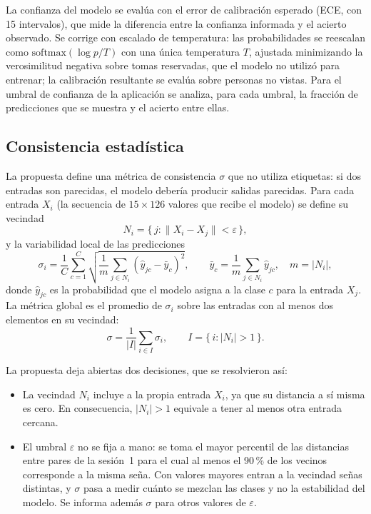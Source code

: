 La confianza del modelo se evalúa con el error de calibración esperado (ECE, con 15 intervalos), que mide la diferencia entre la confianza informada y el acierto observado. Se corrige con escalado de temperatura: las probabilidades se reescalan como $\mathrm{softmax}(\log p / T)$ con una única temperatura $T$, ajustada minimizando la verosimilitud negativa sobre tomas reservadas, que el modelo no utilizó para entrenar; la calibración resultante se evalúa sobre personas no vistas. Para el umbral de confianza de la aplicación se analiza, para cada umbral, la fracción de predicciones que se muestra y el acierto entre ellas.

\subsection{Consistencia estadística}

La propuesta define una métrica de consistencia $\sigma$ que no utiliza etiquetas: si dos entradas son parecidas, el modelo debería producir salidas parecidas. Para cada entrada $X_i$ (la secuencia de $15 \times 126$ valores que recibe el modelo) se define su vecindad
\begin{equation}
    N_i = \{\, j : \lVert X_i - X_j \rVert < \varepsilon \,\},
\end{equation}
y la variabilidad local de las predicciones
\begin{equation}
    \sigma_i = \frac{1}{C} \sum_{c=1}^{C} \sqrt{\frac{1}{m} \sum_{j \in N_i} \left(\hat{y}_{jc} - \bar{y}_{c}\right)^2}, \qquad \bar{y}_c = \frac{1}{m} \sum_{j \in N_i} \hat{y}_{jc}, \quad m = |N_i|,
\end{equation}
donde $\hat{y}_{jc}$ es la probabilidad que el modelo asigna a la clase $c$ para la entrada $X_j$. La métrica global es el promedio de $\sigma_i$ sobre las entradas con al menos dos elementos en su vecindad:
\begin{equation}
    \sigma = \frac{1}{|I|} \sum_{i \in I} \sigma_i, \qquad I = \{\, i : |N_i| > 1 \,\}.
\end{equation}

La propuesta deja abiertas dos decisiones, que se resolvieron así:

\begin{itemize}
    \item La vecindad $N_i$ incluye a la propia entrada $X_i$, ya que su distancia a sí misma es cero. En consecuencia, $|N_i| > 1$ equivale a tener al menos otra entrada cercana.
    \item El umbral $\varepsilon$ no se fija a mano: se toma el mayor percentil de las distancias entre pares de la sesión~1 para el cual al menos el 90\,\% de los vecinos corresponde a la misma seña. Con valores mayores entran a la vecindad señas distintas, y $\sigma$ pasa a medir cuánto se mezclan las clases y no la estabilidad del modelo. Se informa además $\sigma$ para otros valores de $\varepsilon$.
\end{itemize}

